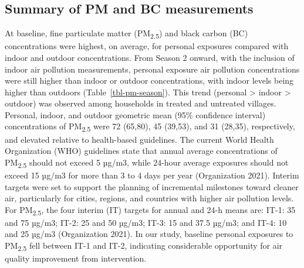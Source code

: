\documentclass[
  letterpaper,
  DIV=11,
  numbers=noendperiod]{scrartcl}
\begin{document}
\hypertarget{summary-of-pm-and-bc-measurements}{%
\subsection{Summary of PM and BC
measurements}\label{summary-of-pm-and-bc-measurements}}

At baseline, fine particulate matter (PM\textsubscript{2.5}) and black
carbon (BC) concentrations were highest, on average, for personal
exposures compared with indoor and outdoor concentrations. From Season 2
onward, with the inclusion of indoor air pollution measurements,
personal exposure air pollution concentrations were still higher than
indoor or outdoor concentrations, with indoor levels being higher than
outdoors (Table~\ref{tbl-pm-season}). This trend (personal
\textgreater{} indoor \textgreater{} outdoor) was observed among
households in treated and untreated villages. Personal, indoor, and
outdoor geometric mean (95\% confidence interval) concentrations of
PM\textsubscript{2.5} were 72 (65,80), 45 (39,53), and 31 (28,35),
respectively, and elevated relative to health-based guidelines. The
current World Health Organization (WHO) guidelines state that annual
average concentrations of PM\textsubscript{2.5} should not exceed 5
µg/m3, while 24-hour average exposures should not exceed 15 µg/m3 for
more than 3 to 4 days per year (Organization 2021). Interim targets were
set to support the planning of incremental milestones toward cleaner
air, particularly for cities, regions, and countries with higher air
pollution levels. For PM\textsubscript{2.5}, the four interim (IT)
targets for annual and 24-h means are: IT-1: 35 and 75 µg/m3; IT-2: 25
and 50 µg/m3; IT-3: 15 and 37.5 µg/m3; and IT-4: 10 and 25 µg/m3
(Organization 2021). In our study, baseline personal exposures to
PM\textsubscript{2.5} fell between IT-1 and IT-2, indicating
considerable opportunity for air quality improvement from intervention.
\end{document}
